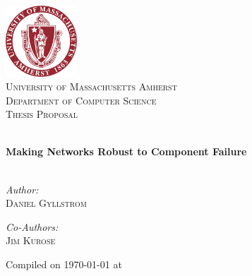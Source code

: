 \begin{titlepage}
 
\begin{center}
 
 
\includegraphics[width=0.20\textwidth]{figs/logo.pdf}\\[2cm]
 
\textsc{\LARGE University of Massachusetts Amherst}\\[1.1cm]
 
\textsc{\Large Department of Computer Science}\\[0.5cm]

\textsc{\Large Thesis Proposal}\\[0.5cm]
 
\vspace{1.0cm}
 
\HRule \\[.6cm]

{ \LARGE \bfseries Making Networks Robust to Component Failure}\\[0.4cm]
\HRule \\[1.5cm]
 
\begin{minipage}{0.4\textwidth}
\begin{flushleft} \large
\emph{Author:}\\
	 \textsc{Daniel Gyllstrom}
	 \end{flushleft}
	 \end{minipage}
	 \begin{minipage}{0.4\textwidth}
	 \begin{flushright} \large
	 \emph{Co-Authors:} \\
		\textsc{Jim Kurose}\\
		\end{flushright}
		\end{minipage}
		 
		\vfill
		 
{\large Compiled on \mmddyyyydate\today} {\large at \currenttime}
 
\end{center}
 
\end{titlepage}

